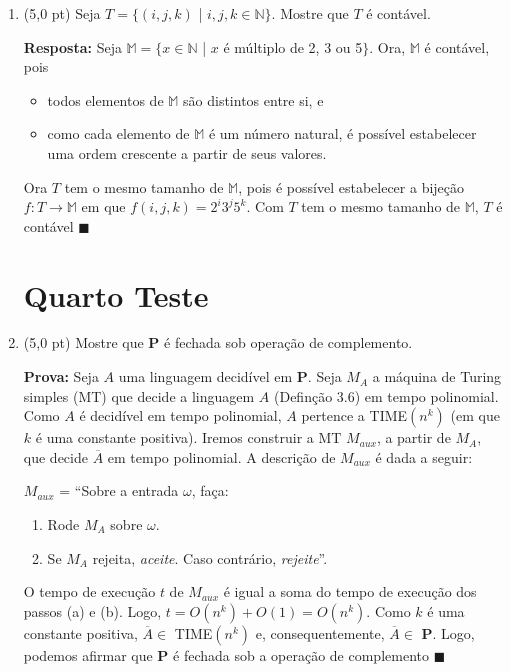 \documentclass[12pt,a4paper,oneside]{article}
\begin{document}
\begin{enumerate}
	\item (5,0 pt) Seja $T = \{(i,j,k)$ | $i,j,k \in \mathbb{N}\}$. Mostre que $T$ é contável.
	
	\vspace{0.3cm}
	
	{\color{blue} {\bf Resposta:} Seja $\mathbb{M} = \{x \in \mathbb{N}$ | $x$ é múltiplo de 2, 3 ou 5$\}$. Ora, $\mathbb{M}$ é contável, pois 
		\begin{itemize}
			\item todos elementos de $\mathbb{M}$ são distintos entre si, e
			\item como cada elemento de $\mathbb{M}$ é um número natural, é possível estabelecer uma ordem crescente a partir de seus valores.
		\end{itemize} 
		
		
	Ora $T$ tem o mesmo tamanho de $\mathbb{M}$, pois é possível estabelecer a bijeção $f:T \rightarrow \mathbb{M}$ em que $f(i,j,k) = 2^i3^j5^k$. Com $T$ tem o mesmo tamanho de $\mathbb{M}$, $T$ é contável $\blacksquare$
	}
	
	\section*{Quarto Teste}
	
	\item (5,0 pt) Mostre que {\bf P} é fechada sob operação de complemento.\\
	
	{\color{blue}
		{\bf Prova:} Seja $A$ uma linguagem decidível em {\bf P}. Seja $M_A$ a máquina de Turing simples (MT) que decide a linguagem $A$ (Definção 3.6) em tempo polinomial. Como $A$ é decidível em tempo polinomial, $A$ pertence a {\sc TIME}$(n^k)$ (em que $k$ é uma constante positiva).  Iremos construir a MT $M_{aux}$, a partir de $M_A$, que decide $\overline{A}$ em tempo polinomial. A descrição de $M_{aux}$ é dada a seguir:
		
		$M_{aux}$ = ``Sobre a entrada $\omega$, faça:
		\begin{enumerate}
			\item Rode $M_A$ sobre $\omega$. 
			\item Se $M_A$ rejeita, {\it aceite}. Caso contrário, {\it rejeite}''.
		\end{enumerate}
		
		O tempo de execução $t$ de $M_{aux}$ é igual a soma do tempo de execução dos passos (a) e (b). Logo, $t = O(n^k) + O(1) = O(n^k)$. Como $k$ é uma constante positiva, $\overline{A} \in$ {\sc TIME}$(n^k)$ e, consequentemente, $\overline{A} \in$ {\bf P}. Logo, podemos afirmar que {\bf P} é fechada sob a operação de complemento $\blacksquare$
	}
	

\end{enumerate}
\end{document}
